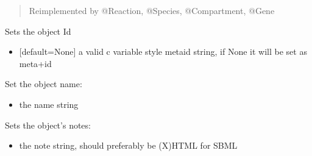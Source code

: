 \documentclass[letterpaper,10pt,english]{sphinxmanual}
\begin{document}
\begin{fulllineitems}
\begin{fulllineitems}
\begin{quote}
\begin{itemize}
\end{itemize}

\sphinxAtStartPar
Reimplemented by @Reaction, @Species, @Compartment, @Gene
\end{quote}

\end{fulllineitems}


\begin{fulllineitems}
\label{\detokenize{modules_doc:cbmpy.CBModel.Fbase.setMetaId}}
\pysigstartsignatures
{}
\pysigstopsignatures
\sphinxAtStartPar
Sets the object Id
\begin{itemize}
\item {} 
\sphinxAtStartPar
{} {[}default=None{]} a valid c variable style metaid string, if None it will be set as meta+id

\end{itemize}

\end{fulllineitems}


\begin{fulllineitems}
\label{\detokenize{modules_doc:cbmpy.CBModel.Fbase.setName}}
\pysigstartsignatures
{}
\pysigstopsignatures
\sphinxAtStartPar
Set the object name:
\begin{itemize}
\item {} 
\sphinxAtStartPar
{} the name string

\end{itemize}

\end{fulllineitems}


\begin{fulllineitems}
\label{\detokenize{modules_doc:cbmpy.CBModel.Fbase.setNotes}}
\pysigstartsignatures
{}
\pysigstopsignatures
\sphinxAtStartPar
Sets the object’s notes:
\begin{itemize}
\item {} 
\sphinxAtStartPar
{} the note string, should preferably be (X)HTML for SBML


\end{itemize}
\end{fulllineitems}
\end{fulllineitems}
\end{document}

